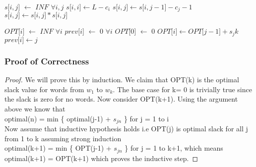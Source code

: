 \documentclass[12pt]{article}
\newcommand*\Let[2]{\State #1 $\gets$ #2}
\begin{document}
\begin{algorithm}[H]
  \caption{}
  \begin{algorithmic}[1]
		\Let{$s\lbrack{i,j}\rbrack$}{$INF$} $\forall {i,j}$ 
			\State ${s\lbrack{i,i}\rbrack} \gets {L- c_i}$
				\State ${s\lbrack{i,j}\rbrack} \gets {s\lbrack{i,j-1}\rbrack - c_j -1}$
				\EndIf
			\EndFor
		\EndFor
			
				\State ${s\lbrack{i,j}\rbrack} \gets {s\lbrack{i,j}\rbrack * s\lbrack{i,j}\rbrack}$
				\EndIf
			\EndFor
		\EndFor
		
		\Let{$OPT\lbrack{i}\rbrack$}{$INF$} $\forall {i}$ 	\Let{$prev\lbrack{i}\rbrack$}{$0$} $\forall {i}$ 	
		\Let{$OPT\lbrack{0}\rbrack$}{$0$} 	
					\State${OPT \lbrack i \rbrack} \gets {OPT \lbrack j-1 \rbrack + s_jk}$
					\State${prev \lbrack i \rbrack} \gets {j}$
					\EndIf
				\EndIf
			\EndFor
		\EndFor

		\State {}
	\EndProcedure
  \end{algorithmic}
\end{algorithm}

\subsubsection{Proof of Correctness}
\begin{proof}
We will prove this by induction. We claim that OPT(k) is the optimal slack value for words from $w_1$ to $w_k$. The base case for k= 0 is trivially true since the slack is zero for no words. Now consider OPT(k+1). Using the argument above we know that\\ optimal(n) = min \{ optimal(j-1) + $s_{jn}$ \} for j = 1 to i
\\
Now assume that inductive hypothesis holds i.e OPT(j) is optimal slack for all j from 1 to k assuming strong induction \\
optimal(k+1) = min \{ OPT(j-1) + $s_{jn}$ \} for j = 1 to k+1, which means\\
optimal(k+1) = OPT(k+1) which proves the inductive step.
\end{proof}
\end{document}
